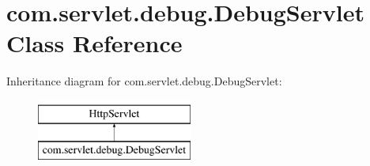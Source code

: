 \hypertarget{classcom_1_1servlet_1_1debug_1_1_debug_servlet}{}\section{com.\+servlet.\+debug.\+Debug\+Servlet Class Reference}
\label{classcom_1_1servlet_1_1debug_1_1_debug_servlet}
Inheritance diagram for com.\+servlet.\+debug.\+Debug\+Servlet\+:\begin{figure}[H]
\begin{center}
\leavevmode
\includegraphics[height=2.000000cm]{classcom_1_1servlet_1_1debug_1_1_debug_servlet}
\end{center}
\end{figure}
